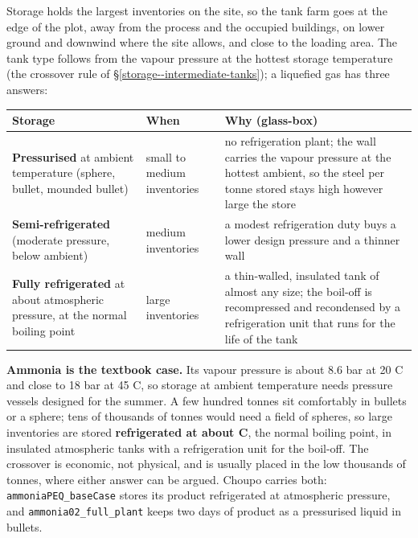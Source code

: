 \documentclass[11pt,a4paper]{article}
\begin{document}
Storage holds the largest inventories on the site, so the tank farm goes
at the edge of the plot, away from the process and the occupied
buildings, on lower ground and downwind where the site allows, and close
to the loading area. The tank type follows from the vapour pressure at
the hottest storage temperature (the crossover rule of
\S\ref{storage--intermediate-tanks}); a liquefied gas has three answers:

\begin{longtable}[]{@{}>{\raggedright\arraybackslash}p{\dimexpr(\linewidth-6\tabcolsep)/3\relax}>{\raggedright\arraybackslash}p{\dimexpr(\linewidth-6\tabcolsep)/3\relax}>{\raggedright\arraybackslash}p{\dimexpr(\linewidth-6\tabcolsep)/3\relax}@{}}
\toprule\noalign{}
Storage & When & Why (glass-box) \\
\midrule\noalign{}
\endhead
\bottomrule\noalign{}
\endlastfoot
\textbf{Pressurised} at ambient temperature (sphere, bullet, mounded
bullet) & small to medium inventories & no refrigeration plant; the wall
carries the vapour pressure at the hottest ambient, so the steel per
tonne stored stays high however large the store \\
\textbf{Semi-refrigerated} (moderate pressure, below ambient) & medium
inventories & a modest refrigeration duty buys a lower design pressure
and a thinner wall \\
\textbf{Fully refrigerated} at about atmospheric pressure, at the normal
boiling point & large inventories & a thin-walled, insulated tank of
almost any size; the boil-off is recompressed and recondensed by a
refrigeration unit that runs for the life of the tank \\
\end{longtable}

\textbf{Ammonia is the textbook case.} Its vapour pressure is about
8.6 bar at 20 \textdegree{}C and close to 18 bar at 45 \textdegree{}C, so
storage at ambient temperature needs pressure vessels designed for the
summer. A few hundred tonnes sit comfortably in bullets or a sphere; tens
of thousands of tonnes would need a field of spheres, so large
inventories are stored \textbf{refrigerated at about 
\textdegree{}C}, the normal boiling point, in insulated atmospheric tanks
with a refrigeration unit for the boil-off. The crossover is economic,
not physical, and is usually placed in the low thousands of tonnes, where
either answer can be argued. Choupo carries both:
\texttt{ammoniaPEQ\_baseCase} stores its product refrigerated at
atmospheric pressure, and \texttt{ammonia02\_full\_plant} keeps two days
of product as a pressurised liquid in bullets.
\end{document}
